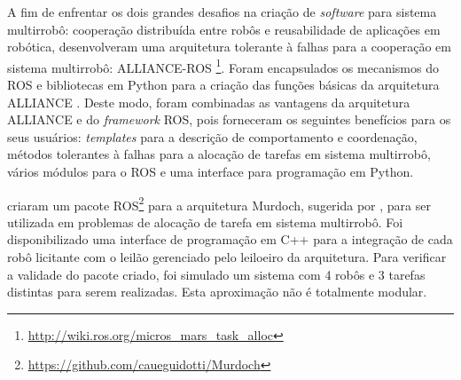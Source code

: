         A fim de enfrentar os dois grandes desafios na criação de \textit{software} para sistema multirrobô: cooperação distribuída entre robôs e reusabilidade de aplicações em robótica,  desenvolveram uma arquitetura tolerante à falhas para a cooperação em sistema multirrobô: ALLIANCE-ROS \footnote{\url{http://wiki.ros.org/micros_mars_task_alloc}}. Foram encapsulados os mecanismos do ROS e bibliotecas em Python para a criação das funções básicas da arquitetura ALLIANCE \cite{ref:parker1998alliance}. Deste modo, foram combinadas as vantagens da arquitetura ALLIANCE e do \textit{framework} ROS, pois forneceram os seguintes benefícios para os seus usuários: \textit{templates} para a descrição de comportamento e coordenação, métodos tolerantes à falhas para a alocação de tarefas em sistema multirrobô, vários módulos para o ROS e uma interface para programação em Python.
        
         criaram um pacote ROS\footnote{\url{https://github.com/caueguidotti/Murdoch}} para a arquitetura Murdoch, sugerida por , para ser utilizada em problemas de alocação de tarefa em sistema multirrobô. Foi disponibilizado uma interface de programação em C++ para a integração de cada robô licitante com o leilão gerenciado pelo leiloeiro da arquitetura. Para verificar a validade do pacote criado, foi simulado um sistema com 4 robôs e 3 tarefas distintas para serem realizadas. Esta aproximação não é totalmente modular.
 